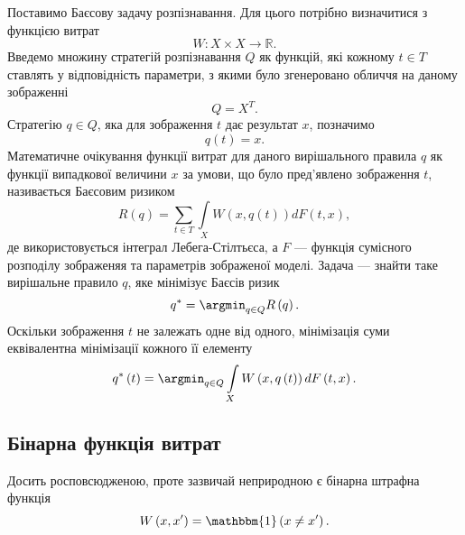 Поставимо Баєсову задачу розпізнавання.
Для цього потрібно визначитися з функцією витрат
\cite{berger1980}
\begin{equation*}
  W: X \times X \rightarrow \mathbb{R}.
\end{equation*}
Введемо множину стратегій розпізнавання $Q$ як функцій,
які кожному $t \in T$ ставлять у відповідність параметри,
з якими було згенеровано обличчя на даному зображенні
\begin{equation*}
  Q = X^T.
\end{equation*}
Стратегію $q \in Q$, яка для зображення $t$ дає результат $x$, позначимо
\begin{equation*}
  q\left( t \right) = x.
\end{equation*}
Математичне очікування функції витрат для даного вирішального правила $q$
як функції випадкової величини $x$ за умови,
що було пред'явлено зображення $t$, називається Баєсовим ризиком
\cite{schlesinger:2002}
\begin{equation*}
  R \left( q \right)
  = \sum\limits_{t \in T} \int\limits_{X}
    W \left( x, q\left( t \right) \right)
    d F\left( t, x \right),
\end{equation*}
де використовується інтеграл Лебега-Стілтьєса,
а $F$ --- функція сумісного розподілу зображеняя
та параметрів зображеної моделі.
Задача --- знайти таке вирішальне правило $q$, яке мінімізує Баєсів ризик
\cite{wald1955selected}
\begin{equation*}
  q^* = \argmin_{q \in Q} R\left( q \right).
\end{equation*}
Оскільки зображення $t$ не залежать одне від одного,
мінімізація суми еквівалентна мінімізації кожного її елементу
\begin{equation*}
  q^*\left( t \right) = \argmin_{q \in Q} \int\limits_{X}
    W \left( x, q\left( t \right) \right)
    d F\left( t, x \right).
\end{equation*}

\subsection{Бінарна функція витрат}

Досить росповсюдженою, проте зазвичай неприродною є бінарна штрафна функція
\begin{equation*}
  W \left( x, x' \right)
  = \mathbbm{1} \left( x \neq x' \right).
\end{equation*}

